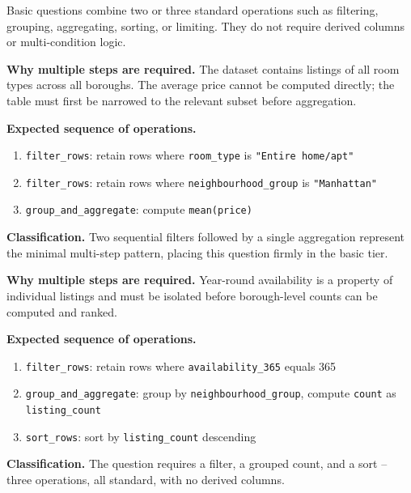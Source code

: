 Basic questions combine two or three standard operations such as filtering, grouping, aggregating, sorting, or limiting. They do not require derived columns or multi-condition logic.


\textbf{Why multiple steps are required.}
The dataset contains listings of all room types across all boroughs. The average price cannot be computed directly; the table must first be narrowed to the relevant subset before aggregation.

\textbf{Expected sequence of operations.}
\begin{enumerate}
  \item \texttt{filter\_rows}: retain rows where \texttt{room\_type} is
    \texttt{"Entire home/apt"}
  \item \texttt{filter\_rows}: retain rows where \texttt{neighbourhood\_group}
    is \texttt{"Manhattan"}
  \item \texttt{group\_and\_aggregate}: compute \texttt{mean(price)}
\end{enumerate}

\textbf{Classification.}
Two sequential filters followed by a single aggregation represent the minimal multi-step pattern, placing this question firmly in the basic tier.



\textbf{Why multiple steps are required.}
Year-round availability is a property of individual listings and must be isolated before borough-level counts can be computed and ranked.

\textbf{Expected sequence of operations.}
\begin{enumerate}
  \item \texttt{filter\_rows}: retain rows where \texttt{availability\_365}
    equals 365
  \item \texttt{group\_and\_aggregate}: group by \texttt{neighbourhood\_group},
    compute \texttt{count} as \texttt{listing\_count}
  \item \texttt{sort\_rows}: sort by \texttt{listing\_count} descending
\end{enumerate}

\textbf{Classification.}
The question requires a filter, a grouped count, and a sort -- three operations, all standard, with no derived columns.

